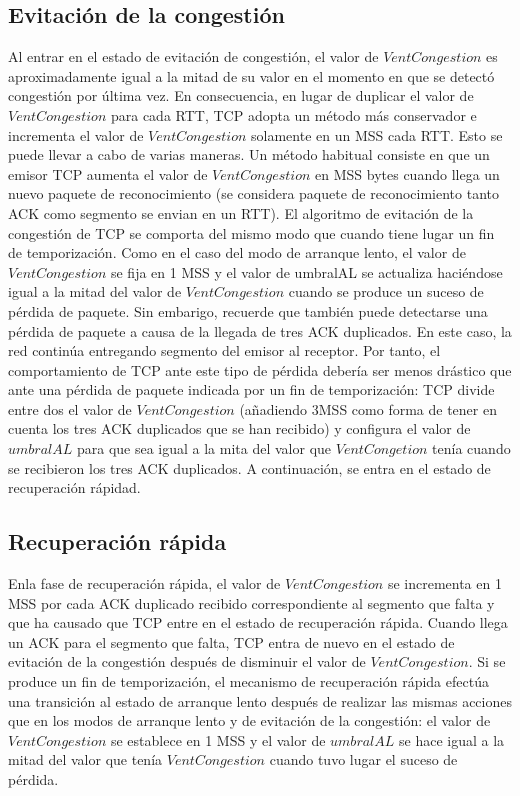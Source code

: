 \documentclass[a4paper,11pt]{article}
\begin{document}
\subsection*{Evitación de la congestión}
Al entrar en el estado de evitación de congestión, el valor de $VentCongestion$ es aproximadamente igual a la mitad de su valor en el momento en que se detectó congestión por última vez. En consecuencia, en lugar de duplicar el valor de $VentCongestion$ para cada RTT, TCP adopta un método más conservador e incrementa el valor de $VentCongestion$ solamente en un MSS cada RTT. Esto se puede llevar a cabo de varias maneras. Un método habitual consiste en que un emisor TCP aumenta el valor de $VentCongestion$ en MSS bytes cuando llega un nuevo paquete de reconocimiento (se considera paquete de reconocimiento tanto ACK como segmento se envian en un RTT). El algoritmo de evitación de la congestión de TCP se comporta del mismo modo que cuando tiene lugar un fin de temporización. Como en el caso del modo de arranque lento, el valor de $VentCongestion$ se fija en 1 MSS y el valor de umbralAL se actualiza haciéndose igual a la mitad del valor de $VentCongestion$ cuando se produce un suceso de pérdida de paquete. Sin embarigo, recuerde que también puede detectarse una pérdida de paquete a causa de la llegada de tres ACK duplicados. En este caso, la red continúa entregando segmento del emisor al receptor. Por tanto, el comportamiento de TCP ante este tipo de pérdida debería ser menos drástico que ante una pérdida de paquete indicada por un fin de temporización: TCP divide entre dos el valor de $VentCongestion$ (añadiendo 3MSS como forma de tener en cuenta los tres ACK duplicados que se han recibido) y configura el valor de $umbralAL$ para que sea igual a la mita del valor que $VentCongetion$ tenía cuando se recibieron los tres ACK duplicados. A continuación, se entra en el estado de recuperación rápidad.

\subsection*{Recuperación rápida}
Enla fase de recuperación rápida, el valor de $VentCongestion$ se incrementa en 1 MSS por cada ACK duplicado recibido correspondiente al segmento que falta y que ha causado que TCP entre en el estado de recuperación rápida. Cuando llega un ACK para el segmento que falta, TCP entra de nuevo en el estado de evitación de la congestión después de disminuir el valor de $VentCongestion$. Si se produce un fin de temporización, el mecanismo de recuperación rápida efectúa una transición al estado de arranque lento después de realizar las mismas acciones que en los modos de arranque lento y de evitación de la congestión: el valor de $VentCongestion$ se establece en 1 MSS y el valor de $umbralAL$ se hace igual a la mitad del valor que tenía $VentCongestion$ cuando tuvo lugar el suceso de pérdida. \\
\end{document}

